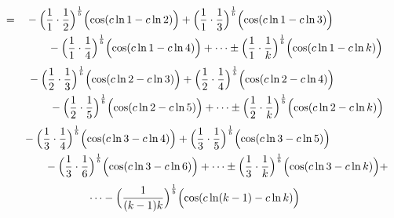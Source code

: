 \documentclass{amsart}
\begin{document}
	
	\[
	\begin{aligned}
		= \quad & -\Bigl( \frac{1}{1} \cdot \frac{1}{2} \Bigr)^\frac1b \Bigl( \cos(c \ln1 - c \ln 2) \Bigr) + \Bigl( \frac{1}{1} \cdot \frac{1}{3} \Bigr)^\frac1b \Bigl( \cos(c \ln1 - c \ln3) \Bigr) \\
		& \qquad -\Bigl( \frac{1}{1} \cdot \frac{1}{4} \Bigr)^\frac1b \Bigl( \cos(c \ln1 - c \ln4) \Bigr) + \dots \pm \Bigl( \frac{1}{1} \cdot \frac{1}{k} \Bigr)^\frac1b \Bigl( \cos(c \ln1 - c \ln k) \Bigr) 
	\end{aligned}
	\]
	\[
	\begin{aligned}
		\quad\quad & -\Bigl( \frac{1}{2} \cdot \frac{1}{3} \Bigr)^\frac1b \Bigl( \cos(c \ln2 - c \ln3) \Bigr) + \Bigl( \frac{1}{2} \cdot \frac{1}{4} \Bigr)^\frac1b \Bigl( \cos(c \ln2 - c \ln4) \Bigr) \\
		& \qquad -\Bigl( \frac{1}{2} \cdot \frac{1}{5} \Bigr)^\frac1b \Bigl( \cos(c \ln2 - c \ln5) \Bigr) + \dots \pm \Bigl( \frac{1}{2} \cdot \frac{1}{k} \Bigr)^\frac1b \Bigl( \cos(c \ln2 - c \ln k) \Bigr)
	\end{aligned}
	\]
	\[
	\begin{aligned}
		\quad\quad & -\Bigl( \frac{1}{3} \cdot \frac{1}{4} \Bigr)^\frac1b \Bigl( \cos(c \ln3 - c \ln4) \Bigr) + \Bigl( \frac{1}{3} \cdot \frac{1}{5} \Bigr)^\frac1b \Bigl( \cos(c \ln3 - c \ln5) \Bigr)\\
		& \qquad -\Bigl( \frac{1}{3} \cdot \frac{1}{6} \Bigr)^\frac1b \Bigl( \cos(c \ln3 - c \ln6) \Bigr) + \dots  \pm \Bigl( \frac{1}{3} \cdot \frac{1}{k} \Bigr)^\frac1b \Bigl( \cos(c \ln3 - c \ln k) \Bigr) +
	\end{aligned}
	\]
	\[ \dots - \Bigl( \frac{1}{(k-1)k} \Bigr)^\frac1b \Bigl( \cos(c \ln (k-1) - c \ln k) \Bigr) \]
	
\end{document}
